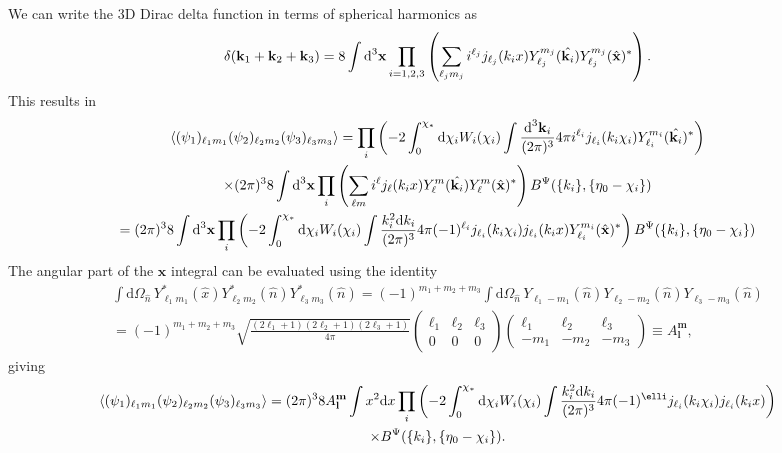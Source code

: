 \documentclass[11pt]{article} %
\DeclareRobustCommand{\d}{\ifmmode\text{d}\else d\fi}
\newcommand{\br}[1]{\ensuremath{\left( #1 \right)}}
\begin{document}
We can write the 3D Dirac delta function in terms of spherical harmonics as
\begin{equation*}
    \delta(\mathbf k_1 + \mathbf k_2 + \mathbf k_3) = 8\int\d^3\mathbf x\prod_{i=1,2,3}\br{ \sum_{\ell_jm_j} i^{\ell_j}j_{\ell_j}(k_ix)Y_{\ell_j}^{m_j}(\hat{\mathbf k_i}) Y_{\ell_j}^{m_j}(\hat{\mathbf x})^* }.
\end{equation*}
This results in
\begin{gather*}
    \langle (\psi_1)_{\ell_1m_1}(\psi_2)_{\ell_2m_2}(\psi_3)_{\ell_3m_3} \rangle= \prod_i\br{-2\int_0^{\chi_*}\d\chi_i W_i(\chi_i)\int\frac{\d^3\mathbf k_i}{(2\pi)^{3}}4\pi i^{\ell_i}j_{\ell_i}(k_i\chi_i)Y_{\ell_i}^{m_i}(\hat{\mathbf k_i})^*} \\
    \times (2\pi)^38\int\d^3\mathbf x\prod_{i}\br{ \sum_{\ell m} i^{\ell}j_{\ell}(k_ix)Y_{\ell}^{m}(\hat{\mathbf k_i}) Y_{\ell}^{m}(\hat{\mathbf x})^* }B^\Psi(\{k_i\}, \{\eta_0-\chi_i\})\\
    = (2\pi)^38\int\d^3\mathbf x\prod_i\br{-2\int_0^{\chi_*}\d\chi_i W_i(\chi_i)\int\frac{k_i^2\d k_i}{(2\pi)^{3}}4\pi (-1)^{\ell_i}j_{\ell_i}(k_i\chi_i)j_{\ell_i}(k_ix) Y_{\ell_i}^{m_i}(\hat{\mathbf x})^*} B^\Psi(\{k_i\}, \{\eta_0-\chi_i\})
\end{gather*}
The angular part of the $\mathbf x$ integral can be evaluated using the identity
\begin{gather*}
    \int \mathrm{d}\Omega_{\hat{n}} \, Y_{\ell_1 m_1}^*(\hat{x}) Y_{\ell_2 m_2}^*(\hat{n}) Y_{\ell_3 m_3}^*(\hat{n}) = (-1)^{m_1 + m_2 + m_3} 
    \int \mathrm{d}\Omega_{\hat{n}} \, Y_{\ell_1 -m_1}(\hat{n}) Y_{\ell_2 -m_2}(\hat{n})Y_{\ell_3 -m_3}(\hat{n}) \\
    = (-1)^{m_1 + m_2 + m_3} 
    \sqrt{\frac{(2\ell_1 + 1)(2\ell_2 + 1)(2\ell_3 + 1)}{4\pi}} \begin{pmatrix} \ell_1 & \ell_2 & \ell_3 \\ 0 & 0 & 0 \end{pmatrix}
    \begin{pmatrix} \ell_1 & \ell_2 & \ell_3 \\ -m_1 & -m_2 & -m_3 \end{pmatrix} \equiv A_{\mathbf{l}}^{\mathbf{m}},
\end{gather*}
giving
\begin{gather*}
    \langle (\psi_1)_{\ell_1m_1}(\psi_2)_{\ell_2m_2}(\psi_3)_{\ell_3m_3} \rangle 
    = (2\pi)^3 8 A_{\mathbf l}^{\mathbf m}\int x^2\d x\prod_i\br{-2\int_0^{\chi_*}\d\chi_i W_i(\chi_i)\int\frac{k_i^2\d k_i}{(2\pi)^{3}}4\pi (-1)^{\elli}j_{\ell_i}(k_i\chi_i)j_{\ell_i}(k_ix)} \\ \times B^\Psi(\{k_i\}, \{\eta_0-\chi_i\}).
\end{gather*}
\end{document}
